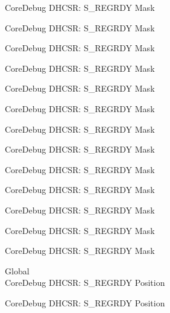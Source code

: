 \begin{DoxyRefList}
\label{deprecated__deprecated000259}%
%
Core\+Debug DHCSR\+: S\+\_\+\+REGRDY Mask 

\label{deprecated__deprecated000316}%
%
Core\+Debug DHCSR\+: S\+\_\+\+REGRDY Mask 

\label{deprecated__deprecated000392}%
%
Core\+Debug DHCSR\+: S\+\_\+\+REGRDY Mask 

\label{deprecated__deprecated000479}%
%
Core\+Debug DHCSR\+: S\+\_\+\+REGRDY Mask 

\label{deprecated__deprecated000581}%
%
Core\+Debug DHCSR\+: S\+\_\+\+REGRDY Mask 

\label{deprecated__deprecated000706}%
%
Core\+Debug DHCSR\+: S\+\_\+\+REGRDY Mask 

\label{deprecated__deprecated000798}%
%
Core\+Debug DHCSR\+: S\+\_\+\+REGRDY Mask 

\label{deprecated__deprecated000852}%
%
Core\+Debug DHCSR\+: S\+\_\+\+REGRDY Mask 

\label{deprecated__deprecated000937}%
%
Core\+Debug DHCSR\+: S\+\_\+\+REGRDY Mask 

\label{deprecated__deprecated000994}%
%
Core\+Debug DHCSR\+: S\+\_\+\+REGRDY Mask 

\label{deprecated__deprecated001070}%
%
Core\+Debug DHCSR\+: S\+\_\+\+REGRDY Mask 

\label{deprecated__deprecated001157}%
%
Core\+Debug DHCSR\+: S\+\_\+\+REGRDY Mask 

\label{deprecated__deprecated001259}%
%
Core\+Debug DHCSR\+: S\+\_\+\+REGRDY Mask  
\item[Global \doxylink{group___c_m_s_i_s___core_debug_ga20a71871ca8768019c51168c70c3f41d}{Core\+Debug\+\_\+\+DHCSR\+\_\+\+S\+\_\+\+REGRDY\+\_\+\+Pos} ]\hfill \\
\label{deprecated__deprecated000027}%
%
Core\+Debug DHCSR\+: S\+\_\+\+REGRDY Position 

\label{deprecated__deprecated000119}%
%
Core\+Debug DHCSR\+: S\+\_\+\+REGRDY Position 


\end{DoxyRefList}

